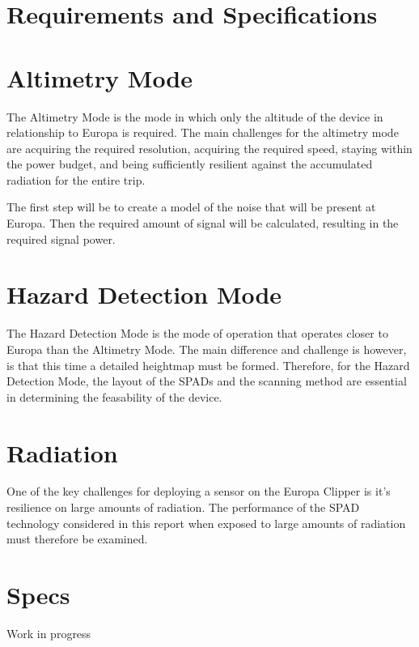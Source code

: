 \documentclass[]{report}
\begin{document}
\chapter{Requirements and Specifications}\label{sec:requirements_and_specifications}

%




\chapter{Altimetry Mode}\label{sec:altimetry_mode}
The Altimetry Mode is the mode in which only the altitude of the device in relationship to Europa is required. The main challenges for the altimetry mode are acquiring the required resolution, acquiring the required speed, staying within the power budget, and being sufficiently resilient against the accumulated radiation for the entire trip.

The first step will be to create a model of the noise that will be present at Europa. Then the required amount of signal will be calculated, resulting in the required signal power. 



% 



%

\chapter{Hazard Detection Mode}\label{sec:hazard_detection_mode}
The Hazard Detection Mode is the mode of operation that operates closer to Europa than the Altimetry Mode. The main difference and challenge is however, is that this time a detailed heightmap must be formed. Therefore, for the Hazard Detection Mode, the layout of the SPADs and the scanning method are essential in determining the feasability of the device. 






\clearpage



\chapter{Radiation}\label{sec:radiation}
One of the key challenges for deploying a sensor on the Europa Clipper is it's resilience on large amounts of radiation. The performance of the SPAD technology considered in this report when exposed to large amounts of radiation must therefore be examined.



\clearpage

\clearpage


%


%


\chapter{Specs}\label{sec:specs}
Work in progress
\end{document}
